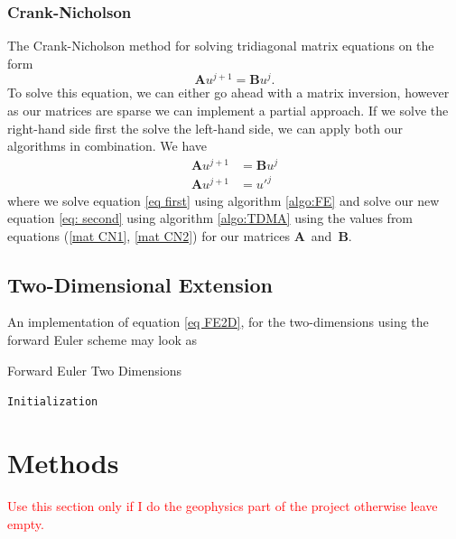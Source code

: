 \documentclass[%
reprint,
nofootinbib,
amsmath,amssymb,
aps,
]{revtex4-1}
\newcommand\todo[1]{\textcolor{red}{#1}}
\begin{document}
\subsubsection{Crank-Nicholson}
The Crank-Nicholson method for solving tridiagonal matrix equations on the form 
\begin{equation}
	\mathbf{A}u^{j+1} = \mathbf{B}u^j.
\end{equation}
To solve this equation, we can either go ahead with a matrix inversion, however as our matrices are sparse we can implement a partial approach. If we solve the right-hand side first the solve the left-hand side, we can apply both our algorithms in combination. We have 
\begin{align}
	\mathbf{A}u^{j+1} &= \mathbf{B}u^j\label{eq first}\\ 
	\mathbf{A}u^{j+1} &= u'^j \label{eq: second}
\end{align}
where we solve equation \eqref{eq first} using algorithm \ref{algo:FE} and solve our new equation \eqref{eq: second} using algorithm \ref{algo:TDMA} using the values from equations (\ref{mat CN1}, \ref{mat CN2}) for our matrices $\mathbf{A}$ and $\mathbf{B}$.

\subsection{Two-Dimensional Extension}
An implementation of equation \eqref{eq FE2D}, for the two-dimensions using the forward Euler scheme may look as
\begin{algorithm}[H]\label{algo:FE2D}
	\SetAlgoLined
	\caption{Forward Euler Two Dimensions}
	\texttt{Initialization}\\
\end{algorithm}

\section{Methods} %
\todo{Use this section only if I do the geophysics part of the project otherwise leave empty.}
\end{document}
